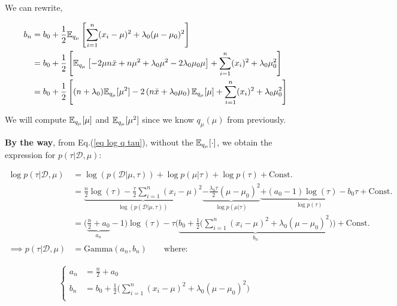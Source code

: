 \documentclass{article}
\def\C{\text{Const.}}
\begin{document}
We can rewrite,

\begin{equation}
\begin{split}
b_n &= b_0 + \frac{1}{2} \mathbb{E}_{q_\mu}  \left[   \sum_{i=1}^n (x_i - \mu)^2  +  \lambda_0(\mu - \mu_0)^2 \right] \\
&= b_0 + \frac{1}{2} \left[ \mathbb{E}_{q_\mu}  \left[  - 2 \mu n \bar{x}  + n \mu^2 +  \lambda_0 \mu^2 - 2 \lambda_0 \mu_0 \mu \right] + \sum_{i=1}^n (x_i)^2 + \lambda_0 \mu_0^2 \right] \\
&=  b_0 + \frac{1}{2} \left[ (n + \lambda_0) \mathbb{E}_{q_\mu} [\mu^2] - 2 \left(n \bar{x} + \lambda_0 \mu_0 \right)  \mathbb{E}_{q_\mu} [\mu]   + \sum_{i=1}^n (x_i)^2 + \lambda_0 \mu_0^2 \right] \\
\end{split}
\end{equation}

We will compute $\mathbb{E}_{q_\mu} [\mu]$ and $\mathbb{E}_{q_\mu} [\mu^2]$ since we know $q_\mu(\mu)$ from previously.


\vspace{2mm}

{\bf By the way}, from Eq.(\ref{eq log q tau}), without the $ \mathbb{E}_{q_\mu} [ \cdot ]$, we obtain the expression for $p(\tau | \mathcal{D}, \mu )$:


\begin{equation}\begin{split}
\log p(\tau | \mathcal{D}, \mu ) &= \log ( p ( \mathcal{D}| \mu, \tau ) ) +  \log p (\mu | \tau) + \log p ( \tau)  + \C \\
&= \underbrace{ \frac{n}{2 }  \log \left( \tau \right) - \frac{\tau}{2} \sum_{i=1}^n (x_i - \mu)^2 }_{\log ( p ( \mathcal{D}| \mu, \tau ) )} \underbrace{ -  \frac{\lambda_0 \tau}{2} (\mu - \mu_0)^2}_{\log p (\mu | \tau) }  \underbrace{+ (a_0-1) \log (  \tau )  -b_0 \tau}_{\log p ( \tau) }  + \C \\
&= \Big(  \underbrace{ \frac{n}{2 } + a_0   }_{a_n}  -1 \Big) \log ( \tau ) - \tau \Big( \underbrace{ b_0  + \frac{1}{2}  \Big( \sum_{i=1}^n (x_i - \mu)^2  +  \lambda_0(\mu - \mu_0)^2 \Big) }_{b_n} \Big)+ \C \\
\implies p(\tau | \mathcal{D}, \mu ) &= \text{Gamma}(a_n, b_n)\quad\quad \text{where:}
\end{split}\end{equation}


\begin{equation}\begin{split}
\begin{cases}
a_n &= \frac{n}{2 } + a_0\\
b_n &= b_0  + \frac{1}{2}  \Big( \sum_{i=1}^n (x_i - \mu)^2  +  \lambda_0(\mu - \mu_0)^2 \Big)\\
\end{cases}
\end{split}\end{equation}
\end{document}
